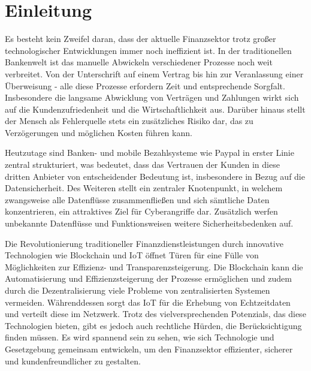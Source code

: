 \section{Einleitung}





Es besteht kein Zweifel daran, dass der aktuelle Finanzsektor trotz gro\ss er technologischer Entwicklungen 
immer noch ineffizient ist. In der traditionellen Bankenwelt ist das manuelle Abwickeln verschiedener 
Prozesse noch weit verbreitet. Von der Unterschrift auf einem Vertrag bis hin zur Veranlassung einer 
Überweisung - alle diese Prozesse erfordern Zeit und entsprechende Sorgfalt. Insbesondere die langsame 
Abwicklung von Verträgen und Zahlungen wirkt sich auf die Kundenzufriedenheit und die Wirtschaftlichkeit 
aus. Darüber hinaus stellt der Mensch als Fehlerquelle stets ein zusätzliches Risiko dar, das zu 
Verzögerungen und möglichen Kosten führen kann.

Heutzutage sind Banken- und mobile Bezahlsysteme wie Paypal in erster Linie zentral strukturiert, was 
bedeutet, dass das Vertrauen der Kunden in diese dritten Anbieter von entscheidender Bedeutung ist, 
insbesondere in Bezug auf die Datensicherheit. Des Weiteren stellt ein zentraler Knotenpunkt, in welchem
zwangsweise alle Datenflüsse zusammenflie\ss en und sich sämtliche Daten konzentrieren, ein attraktives 
Ziel für Cyberangriffe dar. Zusätzlich werfen unbekannte Datenflüsse und Funktionsweisen weitere 
Sicherheitsbedenken auf.


Die Revolutionierung traditioneller Finanzdienstleistungen durch innovative Technologien wie 
Blockchain und IoT öffnet Türen für eine Fülle von Möglichkeiten zur Effizienz- und Transparenzsteigerung.
Die Blockchain kann die Automatisierung und Effizienzsteigerung der Prozesse ermöglichen und zudem durch
die Dezentralisierung viele Probleme von zentralisierten Systemen vermeiden. Währenddessen sorgt das IoT
für die Erhebung von Echtzeitdaten und verteilt diese im Netzwerk.
Trotz des vielversprechenden Potenzials, das diese Technologien bieten, gibt es jedoch 
auch rechtliche Hürden, die Berücksichtigung finden müssen. Es wird spannend sein zu sehen, wie sich 
Technologie und Gesetzgebung gemeinsam entwickeln, um den Finanzsektor effizienter, sicherer und 
kundenfreundlicher zu gestalten.







